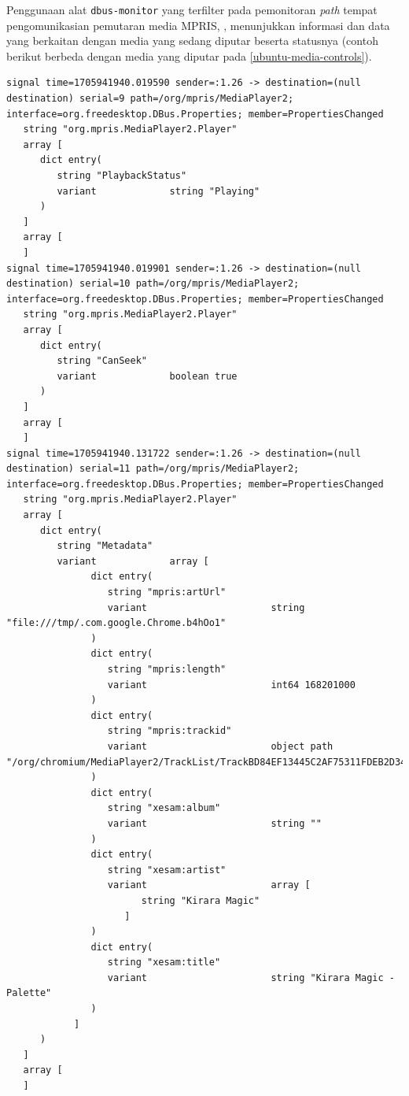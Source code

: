 Penggunaan alat \verb|dbus-monitor| yang terfilter pada pemonitoran \textit{path} tempat pengomunikasian pemutaran media MPRIS, , menunjukkan informasi dan data yang berkaitan dengan media yang sedang diputar beserta statusnya (contoh berikut berbeda dengan media yang diputar pada \autoref{ubuntu-media-controls}).
\begin{lstlisting}
signal time=1705941940.019590 sender=:1.26 -> destination=(null destination) serial=9 path=/org/mpris/MediaPlayer2; interface=org.freedesktop.DBus.Properties; member=PropertiesChanged
   string "org.mpris.MediaPlayer2.Player"
   array [
      dict entry(
         string "PlaybackStatus"
         variant             string "Playing"
      )
   ]
   array [
   ]
signal time=1705941940.019901 sender=:1.26 -> destination=(null destination) serial=10 path=/org/mpris/MediaPlayer2; interface=org.freedesktop.DBus.Properties; member=PropertiesChanged
   string "org.mpris.MediaPlayer2.Player"
   array [
      dict entry(
         string "CanSeek"
         variant             boolean true
      )
   ]
   array [
   ]
signal time=1705941940.131722 sender=:1.26 -> destination=(null destination) serial=11 path=/org/mpris/MediaPlayer2; interface=org.freedesktop.DBus.Properties; member=PropertiesChanged
   string "org.mpris.MediaPlayer2.Player"
   array [
      dict entry(
         string "Metadata"
         variant             array [
               dict entry(
                  string "mpris:artUrl"
                  variant                      string "file:///tmp/.com.google.Chrome.b4hOo1"
               )
               dict entry(
                  string "mpris:length"
                  variant                      int64 168201000
               )
               dict entry(
                  string "mpris:trackid"
                  variant                      object path "/org/chromium/MediaPlayer2/TrackList/TrackBD84EF13445C2AF75311FDEB2D342DEF"
               )
               dict entry(
                  string "xesam:album"
                  variant                      string ""
               )
               dict entry(
                  string "xesam:artist"
                  variant                      array [
                        string "Kirara Magic"
                     ]
               )
               dict entry(
                  string "xesam:title"
                  variant                      string "Kirara Magic - Palette"
               )
            ]
      )
   ]
   array [
   ]
\end{lstlisting}

